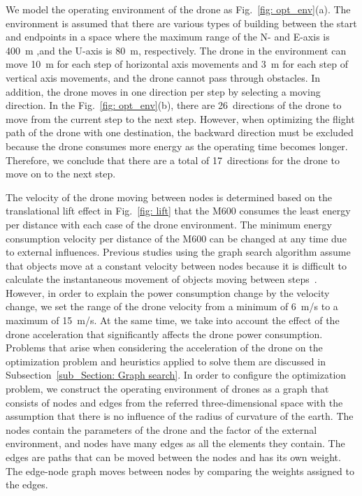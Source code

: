 \documentclass[journal]{./template/IEEEtran}
\begin{document}
We model the operating environment of the drone as Fig.~\ref{fig: opt_env}(a).
The environment is assumed that there are various types of building between the start and endpoints in a space where the maximum range of the N- and E-axis is 400~m ,and the U-axis is 80~m, respectively.
The drone in the environment can move 10~m for each step of horizontal axis movements and 3~m for each step of vertical axis movements, and the drone cannot pass through obstacles. 
In addition, the drone moves in one direction per step by selecting a moving direction.
In the Fig.~\ref{fig: opt_env}(b), there are 26~directions of the drone to move from the current step to the next step.
However, when optimizing the flight path of the drone with one destination, the backward direction must be excluded because the drone consumes more energy as the operating time becomes longer. Therefore, we conclude that there are a total of 17~directions for the drone to move on to the next step.

The velocity of the drone moving between nodes is determined based on the translational lift effect in Fig.~\ref{fig: lift} that the M600 consumes the least energy per distance with each case of the drone environment. 
The minimum energy consumption velocity per distance of the M600 can be changed at any time due to external influences.  
Previous studies using the graph search algorithm assume that objects move at a constant velocity between nodes because it is difficult to calculate the instantaneous movement of objects moving between steps~\cite{ref_8, ref_10, ref_22}. 
However, in order to explain the power consumption change by the velocity change, we set the range of the drone velocity from a minimum of 6~m/s to a maximum of 15~m/s. 
At the same time, we take into account the effect of the drone acceleration that significantly affects the drone power consumption.
Problems that arise when considering the acceleration of the drone on the optimization problem and heuristics applied to solve them are discussed in Subsection~\ref{sub_Section: Graph search}.
In order to configure the optimization problem, we construct the operating environment of drones as a graph that consists of nodes and edges from the referred three-dimensional space with the assumption that there is no influence of the radius of curvature of the earth.
The nodes contain the parameters of the drone and the factor of the external environment, and nodes have many edges as all the elements they contain.
The edges are paths that can be moved between the nodes and has its own weight. The edge-node graph moves between nodes by comparing the weights assigned to the edges.  
\end{document}

